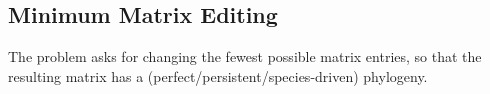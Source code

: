 \subsection{Minimum Matrix Editing}

The problem asks for changing the fewest possible matrix entries, so that the resulting matrix has a (perfect/persistent/species-driven) phylogeny. %
